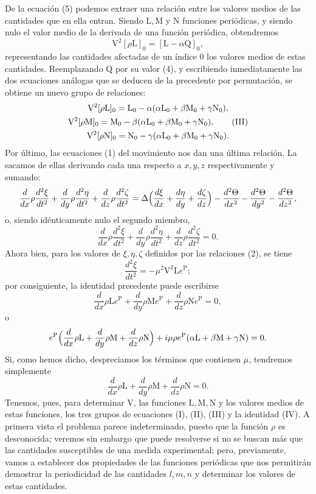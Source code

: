 De la ecuación (5) podemos extraer una relación entre los valores medios
de las cantidades que en ella entran. Siendo $\mathrm L,\mathrm M$ y
$\mathrm N$ funciones periódicas, y siendo nulo el valor medio de la
derivada de una función periódica, obtendremos
\[
\mathrm V^2[\rho \mathrm L]_0=[\mathrm L-\alpha \mathrm Q]_0,
\]
representando las cantidades afectadas de un índice $0$ los valores medios
de estas cantidades. Reemplazando $\mathrm Q$ por su valor (4), y
escribiendo inmediatamente las dos ecuaciones análogas que se deducen de
la precedente por permutación, se obtiene un nuevo grupo de relaciones:
\begin{gather}
\mathrm V^2[\rho \mathrm L]_0=\mathrm L_0-\alpha(\alpha \mathrm L_0+\beta \mathrm M_0+\gamma \mathrm N_0),\notag\\
\mathrm V^2[\rho \mathrm M]_0=\mathrm M_0-\beta(\alpha \mathrm L_0+\beta \mathrm M_0+\gamma \mathrm N_0),
\tag{III}\\
\mathrm V^2[\rho \mathrm N]_0=\mathrm N_0-\gamma(\alpha \mathrm L_0+\beta \mathrm M_0+\gamma \mathrm N_0).\notag
\end{gather}
Por último, las ecuaciones (1) del movimiento nos dan una última relación.
La sacamos de ellas derivando cada una respecto a $x,y,z$ respectivamente
y sumando:
\[
\frac{d}{dx}\rho\frac{d^2\xi}{dt^2}+\frac{d}{dy}\rho\frac{d^2\eta}{dt^2}+\frac{d}{dz}\rho\frac{d^2\zeta}{dt^2}
=\Delta\Bigl(\frac{d\xi}{dx}+\frac{d\eta}{dy}+\frac{d\zeta}{dz}\Bigr)
-\frac{d^2\Theta}{dx^2}-\frac{d^2\Theta}{dy^2}-\frac{d^2\Theta}{dz^2},
\]
o, siendo idénticamente nulo el segundo miembro,
\[
\frac{d}{dx}\rho\frac{d^2\xi}{dt^2}+\frac{d}{dy}\rho\frac{d^2\eta}{dt^2}+\frac{d}{dz}\rho\frac{d^2\zeta}{dt^2}=0.
\]
Ahora bien, para los valores de $\xi,\eta,\zeta$ definidos por las
relaciones (2), se tiene
\[
\frac{d^2\xi}{dt^2}=-\mu^2\mathrm V^2\mathrm Le^{\mathrm P};
\]
por consiguiente, la identidad precedente puede escribirse
\[
\frac{d}{dx}\rho \mathrm Le^{\mathrm P}+\frac{d}{dy}\rho \mathrm Me^{\mathrm P}+\frac{d}{dz}\rho \mathrm Ne^{\mathrm P}=0,
\]
o
\[
e^{\mathrm P}\Bigl(\frac{d}{dx}\rho \mathrm L+\frac{d}{dy}\rho \mathrm M+\frac{d}{dz}\rho \mathrm N\Bigr)
+i\mu\rho e^{\mathrm P}(\alpha \mathrm L+\beta \mathrm M+\gamma \mathrm N)=0.
\]
Si, como hemos dicho, despreciamos los términos que contienen $\mu$,
tendremos simplemente
\begin{equation}
\frac{d}{dx}\rho \mathrm L+\frac{d}{dy}\rho \mathrm M+\frac{d}{dz}\rho \mathrm N=0.
\tag{IV}
\end{equation}
Tenemos, pues, para determinar $\mathrm V$, las funciones $\mathrm
L,\mathrm M,\mathrm N$ y los valores medios de estas funciones, los tres
grupos de ecuaciones (I), (II), (III) y la identidad (IV). A primera
vista el problema parece indeterminado, puesto que la función $\rho$ es
desconocida; veremos sin embargo que puede resolverse si no se buscan más
que las cantidades susceptibles de una medida experimental; pero,
previamente, vamos a establecer dos propiedades de las funciones
periódicas que nos permitirán demostrar la periodicidad de las cantidades
$l,m,n$ y determinar los valores de estas cantidades.

